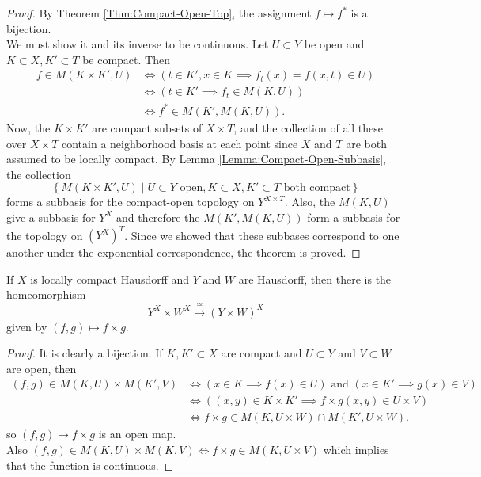 \begin{proof}
    By Theorem \ref{Thm:Compact-Open-Top}, the assignment
    $f \mapsto f^{*}$ is a bijection.\\
    We must show it and its inverse to be continuous.
    Let $U \subset Y$ be open and
    $K \subset X, K'\subset T$ be compact. Then
    \begin{align*}
        f \in M \left( K \times K', U \right) 
        &\iff \left( t \in K', x \in K
        \implies f_t(x) = f(x,t) \in U \right) \\
        &\iff \left( t \in K' \implies 
        f_t \in M \left( K, U \right) \right) \\
        &\iff f^{*} \in M \left( K', M\left( K ,U \right)  \right).
    \end{align*}
    Now, the $K \times K'$ are compact
    subsets of $X \times T$, and the collection
    of all these over $X \times T$ contain
    a neighborhood basis at each point since
    $X$ and $T$ are both assumed to be locally compact.
    By Lemma \ref{Lemma:Compact-Open-Subbasis},
    the collection
    \[
        \left\{ M\left( K \times K', U \right) 
     \mid U \subset Y \text{ open}, 
 K \subset X, K' \subset T \text{ both compact}\right\} 
\]
forms a subbasis for the compact-open topology on
$Y^{X \times T}$. Also, the
$M\left( K, U \right)  $ give a subbasis for
$Y^{X}$ and therefore the
$M \left( K', M\left( K,U \right)  \right) $ form
a subbasis for the topology on
$\left( Y^{X} \right)^{T}$.
Since we showed that these subbases correspond to one
another under the exponential correspondence, the
theorem is proved.
\end{proof}

\begin{proposition}[]
    If $X$ is locally compact Hausdorff and $Y$ and $W$ are
    Hausdorff, then there is the homeomorphism
    \[
    Y^{X} \times W^{X}
    \stackrel{\cong}{\to} \left( Y \times W \right)^{X}
    \] 
    given by $\left( f,g \right) \mapsto 
    f \times g$.
\end{proposition}

\begin{proof}
    It is clearly a bijection.
    If $K, K' \subset X$ are compact
    and $U \subset Y$ and
    $V \subset W$ are open, then
    \begin{align*}
        \left( f,g \right) 
        \in M \left( K,U \right) \times 
        M\left( K',V \right) 
        &\iff \left( x \in K \implies f(x) \in U \right) 
        \text{ and } \left( x \in K' \implies
        g(x) \in V \right) \\
        &\iff \left( (x,y) \in K \times K' \implies
        f \times g(x,y) \in U \times V \right) \\
        &\iff f\times g \in 
        M\left( K , U \times W \right) \cap
        M\left( K', U \times W \right) .
    \end{align*}
    so $\left( f, g \right) \mapsto f \times g$ is an
    open map.\\
    Also $\left( f,g \right) \in 
    M(K, U) \times M(K,V) \iff
    f \times g \in M \left( K, U \times V \right) $ which
    implies that the function is continuous.
\end{proof}


